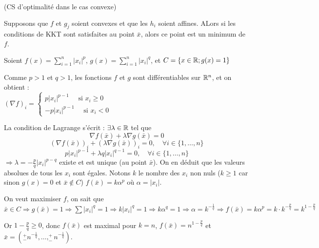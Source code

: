 \begin{theoreme} (CS d'optimalité dans le cas convexe)

Supposons que $f$ et $g_j$ soient convexes et que les $h_i$ soient affines. ALors si les conditions de KKT sont satisfaites au point $\bar{x}$, alors ce point est un minimum de $f$.
\end{theoreme}
\begin{exemple} %

	Soient $ \displaystyle f(x) = \sum_{i=1}^n |x_i|^p $, 
	$ \displaystyle g(x) = \sum_{i=1}^n |x_i|^q $, et
	$ \displaystyle C = \{ x \in \mathbb{R} ; g(x) = 1 \} $
	
	
	Comme $p>1$ et $q>1$, les fonctions $f$ et $g$ sont différentiables sur $\mathbb{R}^n$, et on obtient :\\ $\displaystyle (\nabla f)_i = \begin{cases} p |x_i|^{p-1} \quad \text{ si }x_i\geq 0 \\  -p |x_i|^{p-1} \quad \text{ si } x_i < 0  \end{cases}$ 
	
	La condition de Lagrange s'écrit : $\exists \lambda \in \mathbb{R}$ tel que 
	\[ \nabla f(\bar{x}) + \lambda \nabla g(\bar{x}) = 0 \]
	\[ (\nabla f(\bar{x}))_i + (\lambda \nabla g(\bar{x}))_i = 0 , \quad \forall i \in \{ 1, \dots, n \} \]
	\[ p|x_i|^{p-1} + \lambda q|x_i|^{q-1} = 0 , \quad \forall i \in \{ 1, \dots, n \} \]
	$ \Rightarrow \lambda = - \frac{p}{q}|x_i|^{p-q} $ existe et est unique (au point $\bar{x}$). On en déduit que les valeurs absolues de tous les $x_i$ sont égales.
	Notons $k$ le nombre des $x_i$ non nuls ($k \geq 1$ car sinon $g(x) = 0$ et $\bar{x} \not \in C$)
	$f(\bar{x}) = k \alpha ^p$ où $\alpha = |x_i|$.
	
	On veut maximiser $f$, on sait que $\bar{x} \in C \Rightarrow g(\bar{x}) = 1 \Rightarrow \sum |x_i|^q = 1 \Rightarrow k |x_i|^q = 1 \Rightarrow k \alpha^q = 1 \Rightarrow \alpha = k^{-\frac{1}{q}} \Rightarrow f(\bar{x}) = k \alpha^p = k \cdot k^{-\frac{p}{q}} = k^{1-\frac{p}{q}} $
	
	Or $1-\frac{p}{q} \geq 0$, donc $f(\bar{x})$ est maximal pour $k=n$, $f(\bar{x}) = n^{1-\frac{p}{q}}$ et $\bar{x} = (^+_- n^{-\frac{1}{q}}, \dots, ^+_- n^{-\frac{1}{q}})$.
	
\end{exemple}

